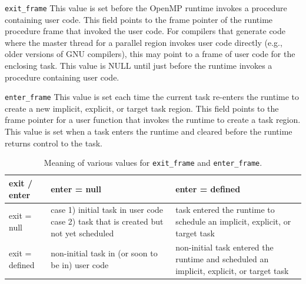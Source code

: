\documentclass{article}
\begin{document}
\begin{description}
\item \verb|exit_frame|
     This value is set before the OpenMP runtime invokes a procedure containing user code. 
     This field points to the frame pointer of the runtime procedure frame that invoked the user code. 
     For compilers that generate code where the master thread for a parallel region invokes user code directly (e.g., older versions of GNU compilers), 
     this may point to a frame of user code for the enclosing task.
     This value is NULL until just before the runtime invokes a procedure containing user code. 
  
\item \verb|enter_frame|
     This value is set each time the current task re-enters the 
     runtime to create a new implicit, explicit, or target task region. This field 
     points to the frame pointer for a user function that invokes the runtime to create a task region.  
     This value is set when a task enters the runtime and cleared before the runtime returns control to the task.

\end{description}



\begin{table}
\begin{center}
\begin{tabular}{|l|p{2in}|p{2in}|}
\hline
exit / enter 	& enter = null										& enter = defined \\\hline\hline
exit = null		& case 1)  initial task in user code case 2) task that is created but not yet scheduled &  task entered the runtime to schedule an implicit, explicit, or target task \\\hline
exit = defined 	& non-initial task in (or soon to be in) user code							& non-initial task entered the runtime and scheduled an implicit, explicit, or target task\\\hline
\end{tabular}
\end{center}
\caption{Meaning of various values for {\tt exit\_frame} and {\tt enter\_frame}.}
\label{tab:frame}
\end{table}
\end{document}
